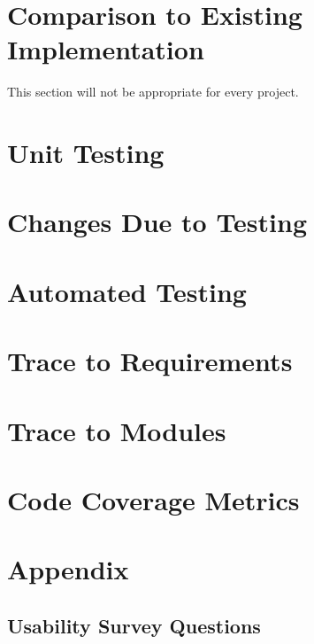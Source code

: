 \documentclass[12pt, titlepage]{article}
\begin{document}
\section{Comparison to Existing Implementation}	

This section will not be appropriate for every project.

\section{Unit Testing}

\section{Changes Due to Testing}


\section{Automated Testing}
		
\section{Trace to Requirements}
		
\section{Trace to Modules}		

\section{Code Coverage Metrics}




\newpage{}

\section{Appendix}

\subsection{Usability Survey Questions} \label{appen}
\end{document}
